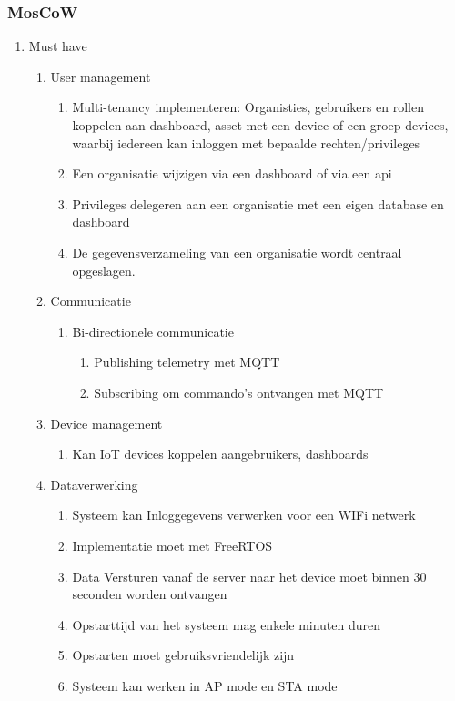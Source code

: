\subsubsection{MosCoW}

\begin{enumerate}
	\item Must have
	\begin{enumerate}
		\item User management
		\begin{enumerate}
			\item Multi-tenancy implementeren: Organisties, gebruikers en rollen koppelen aan dashboard, asset met een device of een groep devices, waarbij iedereen kan inloggen met bepaalde rechten/privileges			
			\item Een organisatie wijzigen via een dashboard of via een api			
			\item Privileges delegeren aan een organisatie met een eigen database en dashboard			
			\item De gegevensverzameling van een organisatie wordt centraal opgeslagen.			
		\end{enumerate}
		\item Communicatie
		\begin{enumerate}
			\item Bi-directionele communicatie
			\begin{enumerate}
				\item Publishing telemetry met MQTT
				\item Subscribing om commando’s ontvangen met MQTT
			\end{enumerate}
		\end{enumerate}
		\item Device management
		\begin{enumerate}
			\item Kan IoT devices koppelen aangebruikers, dashboards
		\end{enumerate}
		\item Dataverwerking
		\begin{enumerate}
			\item Systeem kan Inloggegevens verwerken voor een WIFi netwerk
			
			\item Implementatie moet met FreeRTOS 
			
			\item Data Versturen vanaf de server naar het device moet binnen 30 seconden worden ontvangen
			\item Opstarttijd van het systeem mag enkele minuten duren 
			\item Opstarten moet gebruiksvriendelijk zijn
			\item Systeem kan werken in AP mode en STA mode
			

\end{enumerate}
\end{enumerate}
\end{enumerate}
